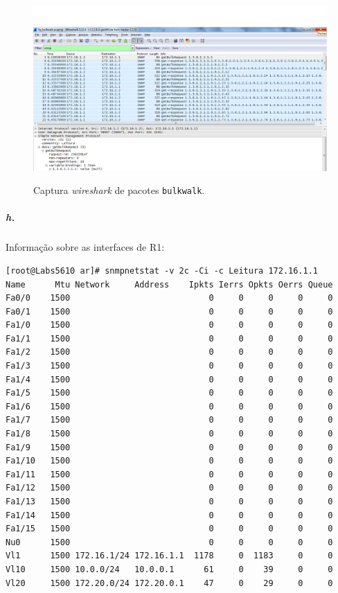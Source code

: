 \begin{figure}[h]
\centering
\includegraphics[width=1\textwidth, height=0.4\textheight]{5g_bulkwalk.png}
\label{fig:9-capturaWireshark}
\caption{Captura \emph{wireshark} de pacotes \texttt{bulkwalk}.}
\end{figure}

\newpage

\subparagraph{h.}
Informação sobre as interfaces de \textsf{R1}:
\begin{verbatim}
[root@Labs5610 ar]# snmpnetstat -v 2c -Ci -c Leitura 172.16.1.1
Name      Mtu Network     Address    Ipkts Ierrs Opkts Oerrs Queue
Fa0/0    1500                            0     0     0     0     0
Fa0/1    1500                            0     0     0     0     0
Fa1/0    1500                            0     0     0     0     0
Fa1/1    1500                            0     0     0     0     0
Fa1/2    1500                            0     0     0     0     0
Fa1/3    1500                            0     0     0     0     0
Fa1/4    1500                            0     0     0     0     0
Fa1/5    1500                            0     0     0     0     0
Fa1/6    1500                            0     0     0     0     0
Fa1/7    1500                            0     0     0     0     0
Fa1/8    1500                            0     0     0     0     0
Fa1/9    1500                            0     0     0     0     0
Fa1/10   1500                            0     0     0     0     0
Fa1/11   1500                            0     0     0     0     0
Fa1/12   1500                            0     0     0     0     0
Fa1/13   1500                            0     0     0     0     0
Fa1/14   1500                            0     0     0     0     0
Fa1/15   1500                            0     0     0     0     0
Nu0      1500                            0     0     0     0     0
Vl1      1500 172.16.1/24 172.16.1.1  1178     0  1183     0     0
Vl10     1500 10.0.0/24   10.0.0.1      61     0    39     0     0
Vl20     1500 172.20.0/24 172.20.0.1    47     0    29     0     0
\end{verbatim}

